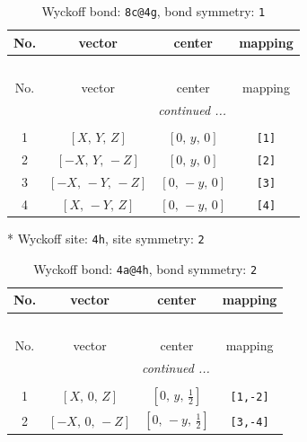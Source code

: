 \documentclass[fleqn,8pt]{jsarticle}
\begin{document}
\begin{longtable}{cccc}
\caption{Wyckoff bond: {\tt 8c@4g}, bond symmetry: {\tt 1}}
 \\
 \hline \hline
No. & vector & center & mapping \\ \hline \endfirsthead

\multicolumn{3}{l}{\tablename\ \thetable{}} \\
 \hline \hline
No. & vector & center & mapping \\ \hline \endhead

 \hline \hline
\multicolumn{3}{r}{\footnotesize\it continued ...} \\ \endfoot

 \hline \hline
\multicolumn{3}{r}{} \\ \endlastfoot

1 & $\left[ X,\, Y,\, Z \right]$ & $\left[ 0,\, y,\, 0 \right]$ & {\tt [1]} \\ \hline
2 & $\left[ - X,\, Y,\, - Z \right]$ & $\left[ 0,\, y,\, 0 \right]$ & {\tt [2]} \\ \hline
3 & $\left[ - X,\, - Y,\, - Z \right]$ & $\left[ 0,\, - y,\, 0 \right]$ & {\tt [3]} \\ \hline
4 & $\left[ X,\, - Y,\, Z \right]$ & $\left[ 0,\, - y,\, 0 \right]$ & {\tt [4]} \\
\end{longtable}
* Wyckoff site: {\tt 4h}, site symmetry: {\tt 2}
\renewcommand{\arraystretch}{1.2}
\begin{longtable}{cccc}
\caption{Wyckoff bond: {\tt 4a@4h}, bond symmetry: {\tt 2}}
 \\
 \hline \hline
No. & vector & center & mapping \\ \hline \endfirsthead

\multicolumn{3}{l}{\tablename\ \thetable{}} \\
 \hline \hline
No. & vector & center & mapping \\ \hline \endhead

 \hline \hline
\multicolumn{3}{r}{\footnotesize\it continued ...} \\ \endfoot

 \hline \hline
\multicolumn{3}{r}{} \\ \endlastfoot

1 & $\left[ X,\, 0,\, Z \right]$ & $\left[ 0,\, y,\, \frac{1}{2} \right]$ & {\tt [1,-2]} \\ \hline
2 & $\left[ - X,\, 0,\, - Z \right]$ & $\left[ 0,\, - y,\, \frac{1}{2} \right]$ & {\tt [3,-4]} \\
\end{longtable}
\end{document}
